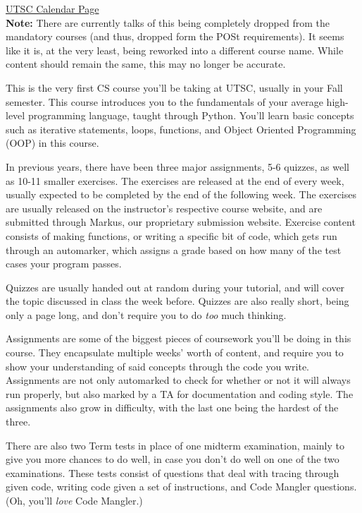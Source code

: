 \documentclass[11pt]{article}
\begin{document}
\href{https://utsc.calendar.utoronto.ca/course/CSCA08H3}{UTSC Calendar Page}\\

\textbf{Note:} There are currently talks of this being completely dropped from the mandatory courses (and thus, dropped form the POSt requirements). It seems like it is, at the very least, being reworked into a different course name. While content should remain the same, this may no longer be accurate.\par
This is the very first CS course you'll be taking at UTSC, usually in your Fall semester.  This course introduces you to the fundamentals of your average high-level programming language, taught through Python.  You'll learn basic concepts such as iterative statements, loops, functions, and Object Oriented Programming (OOP) in this course.\par  
In previous years, there have been three major assignments, 5-6 quizzes, as well as 10-11 smaller exercises.  The exercises are released at the end of every week, usually expected to be completed by the end of the following week.  The exercises are usually released on the instructor's respective course website, and are submitted through Markus, our proprietary submission website.  Exercise content consists of making functions, or writing a specific bit of code, which gets run through an automarker, which assigns a grade based on how many of the test cases your program passes.\par
Quizzes are usually handed out at random during your tutorial, and will cover the topic discussed in class the week before.  Quizzes are also really short, being only a page long, and don't require you to do \textit{too} much thinking.\par
Assignments are some of the biggest pieces of coursework you'll be doing in this course.  They encapsulate multiple weeks' worth of content, and require you to show your understanding of said concepts through the code you write.  Assignments are not only automarked to check for whether or not it will always run properly, but also marked by a TA for documentation and coding style.  The assignments also grow in difficulty, with the last one being the hardest of the three. \par
There are also two Term tests in place of one midterm examination, mainly to give you more chances to do well, in case you don't do well on one of the two examinations.  These tests consist of questions that deal with tracing through given code, writing code given a set of instructions, and Code Mangler questions. (Oh, you'll \textit{love} Code Mangler.)\par
\end{document}

